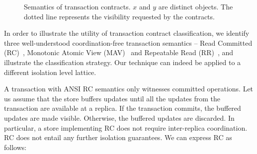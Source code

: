 \begin{figure}
\centering
{}
\hfill
{}
\hfill
{}
\caption{Semantics of transaction contracts. $x$ and $y$ are distinct objects.
The dotted line represents the visibility requested by the contracts.}
\label{fig:cleanliness_examples}
\end{figure}

In order to illustrate the utility of transaction contract classification, we
identify three well-understood coordination-free transaction semantics -- Read
Committed (RC)~\cite{}, Monotonic Atomic View (MAV)~\cite{} and Repeatable Read
(RR)~\cite{}, and illustrate the classification strategy. Our technique can
indeed be applied to a different isolation level lattice.

A transaction with ANSI RC semantics only witnesses committed operations. Let
us assume that the store buffers updates until all the updates from the
transaction are available at a replica. If the transaction commits, the
buffered updates are made visible. Otherwise, the buffered updates are
discarded. In particular, a store implementing RC does not require
inter-replica coordination. RC does not entail any further isolation
guarantees. We can express RC as follows:


